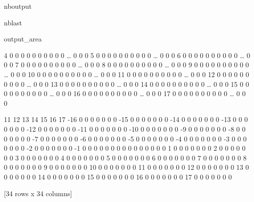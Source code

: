 \documentclass[letterpaper,10pt,english]{sphinxmanual}
\begin{document}
\begin{sphinxuseclass}{nboutput}
\begin{sphinxuseclass}{nblast}
{\begin{sphinxuseclass}{output_area}
\begin{sphinxuseclass}{}
\begin{sphinxVerbatim}[commandchars=\\\{\}]
 4     0    0    0    0    0    0    0    0    0    0  {\ldots}    0    0    0
 5     0    0    0    0    0    0    0    0    0    0  {\ldots}    0    0    0
 6     0    0    0    0    0    0    0    0    0    0  {\ldots}    0    0    0
 7     0    0    0    0    0    0    0    0    0    0  {\ldots}    0    0    0
 8     0    0    0    0    0    0    0    0    0    0  {\ldots}    0    0    0
 9     0    0    0    0    0    0    0    0    0    0  {\ldots}    0    0    0
 10    0    0    0    0    0    0    0    0    0    0  {\ldots}    0    0    0
 11    0    0    0    0    0    0    0    0    0    0  {\ldots}    0    0    0
 12    0    0    0    0    0    0    0    0    0    0  {\ldots}    0    0    0
 13    0    0    0    0    0    0    0    0    0    0  {\ldots}    0    0    0
 14    0    0    0    0    0    0    0    0    0    0  {\ldots}    0    0    0
 15    0    0    0    0    0    0    0    0    0    0  {\ldots}    0    0    0
 16    0    0    0    0    0    0    0    0    0    0  {\ldots}    0    0    0
 17    0    0    0    0    0    0    0    0    0    0  {\ldots}    0    0    0

      11   12   13   14   15   16   17
-16    0    0    0    0    0    0    0
-15    0    0    0    0    0    0    0
-14    0    0    0    0    0    0    0
-13    0    0    0    0    0    0    0
-12    0    0    0    0    0    0    0
-11    0    0    0    0    0    0    0
-10    0    0    0    0    0    0    0
-9     0    0    0    0    0    0    0
-8     0    0    0    0    0    0    0
-7     0    0    0    0    0    0    0
-6     0    0    0    0    0    0    0
-5     0    0    0    0    0    0    0
-4     0    0    0    0    0    0    0
-3     0    0    0    0    0    0    0
-2     0    0    0    0    0    0    0
-1     0    0    0    0    0    0    0
 0     0    0    0    0    0    0    0
 1     0    0    0    0    0    0    0
 2     0    0    0    0    0    0    0
 3     0    0    0    0    0    0    0
 4     0    0    0    0    0    0    0
 5     0    0    0    0    0    0    0
 6     0    0    0    0    0    0    0
 7     0    0    0    0    0    0    0
 8     0    0    0    0    0    0    0
 9     0    0    0    0    0    0    0
 10    0    0    0    0    0    0    0
 11    0    0    0    0    0    0    0
 12    0    0    0    0    0    0    0
 13    0    0    0    0    0    0    0
 14    0    0    0    0    0    0    0
 15    0    0    0    0    0    0    0
 16    0    0    0    0    0    0    0
 17    0    0    0    0    0    0    0

[34 rows x 34 columns]
\end{sphinxVerbatim}



\end{sphinxuseclass}
\end{sphinxuseclass}
}

\end{sphinxuseclass}
\end{sphinxuseclass}
\end{document}

